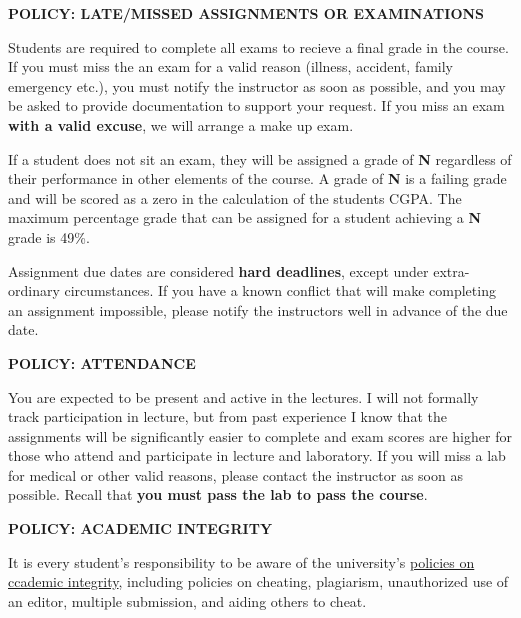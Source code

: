 \documentclass[11pt]{article}
\begin{document}
\textbf{POLICY: LATE/MISSED ASSIGNMENTS OR EXAMINATIONS}

Students are required to complete all exams to recieve a final grade in the course. If you must miss the an exam for a valid reason (illness, accident, family emergency etc.), you must notify the instructor as soon as possible, and you may be asked to provide documentation to support your request. If you miss an exam \textbf{with a valid excuse}, we will arrange a make up exam.

If a student does not sit an exam, they will be assigned a grade of \textbf{N} regardless of their performance in other elements of the course. A grade of \textbf{N} is a failing grade and will be scored as a zero in the calculation of the students CGPA. The maximum percentage grade that can be assigned for a student achieving a \textbf{N} grade is 49\%. 

Assignment due dates are considered \textbf{hard deadlines}, except under extra-ordinary circumstances. If you have a known conflict that will make completing an assignment impossible, please notify the instructors well in advance of the due date.

\textbf{POLICY: ATTENDANCE}

You are expected to be present and active in the lectures. I will not formally track participation in lecture, but from past experience I know that the assignments will be significantly easier to complete and exam scores are higher for those who attend and participate in lecture and laboratory. If you will miss a lab for medical or other valid reasons, please contact the instructor as soon as possible. Recall that \textbf{you must pass the lab to pass the course}.

\textbf{POLICY: ACADEMIC INTEGRITY}

It is every student's responsibility to be aware of the university's \href{https://web.uvic.ca/calendar/undergrad/info/regulations/academic-integrity.html}{policies on ccademic integrity}, including policies on cheating, plagiarism, unauthorized use of an editor, multiple submission, and aiding others to cheat. 
\end{document}

